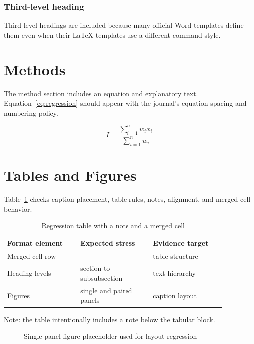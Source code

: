 \subsubsection{Third-level heading}
Third-level headings are included because many official Word templates define them even when their LaTeX templates use a different command style.

\section{Methods}
The method section includes an equation and explanatory text. Equation~\ref{eq:regression} should appear with the journal's equation spacing and numbering policy.

\begin{equation}
I = \frac{\sum_{i=1}^{n} w_i x_i}{\sum_{i=1}^{n} w_i}
\label{eq:regression}
\end{equation}

\section{Tables and Figures}
Table~\ref{tab:regression} checks caption placement, table rules, notes, alignment, and merged-cell behavior.

\begin{table}[htbp]
\centering
\caption{Regression table with a note and a merged cell}
\label{tab:regression}
\begin{threeparttable}
\begin{tabular}{@{}p{0.29\linewidth}@{}p{0.29\linewidth}@{}p{0.29\linewidth}@{}}
\toprule
Format element & Expected stress & Evidence target \\
\midrule
\multicolumn{2}{l}{Merged-cell row} & table structure \\
Heading levels & section to subsubsection & text hierarchy \\
Figures & single and paired panels & caption layout \\
\bottomrule
\end{tabular}
\begin{tablenotes}
\small
\item Note: the table intentionally includes a note below the tabular block.
\end{tablenotes}
\end{threeparttable}
\end{table}

\begin{figure}[htbp]
\centering
\fbox{\rule{0pt}{35mm}\rule{0.82\linewidth}{0pt}}
\caption{Single-panel figure placeholder used for layout regression}
\label{fig:single}
\end{figure}

